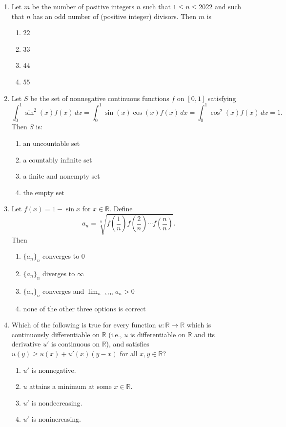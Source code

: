 \documentclass[11pt, a4paper]{article}
\begin{document}
\begin{enumerate}
  \item Let $m$ be the number of positive integers $n$ such that $1 \le n \le 2022$ and such that $n$ has an odd number of (positive integer) divisors. Then $m$ is
  \begin{enumerate}[label=(\alph*)]
    \item $22$
    \item $33$
    \item $44$
    \item $55$
  \end{enumerate}

  \item Let $S$ be the set of nonnegative continuous functions $f$ on $[0,1]$ satisfying
  \[
    \int_0^1 \sin^2(x) f(x)\,dx = \int_0^1 \sin(x)\cos(x) f(x)\,dx = \int_0^1 \cos^2(x) f(x)\,dx = 1.
  \]
  Then $S$ is:
  \begin{enumerate}[label=(\alph*)]
    \item an uncountable set
    \item a countably infinite set
    \item a finite and nonempty set
    \item the empty set
  \end{enumerate}

  \item Let $f(x) = 1 - \sin x$ for $x \in \mathbb{R}$. Define
  \[
    a_n = \sqrt[n]{f\left(\frac{1}{n}\right) f\left(\frac{2}{n}\right) \cdots f\left(\frac{n}{n}\right)}.
  \]
  Then
  \begin{enumerate}[label=(\alph*)]
    \item $\{a_n\}_n$ converges to $0$
    \item $\{a_n\}_n$ diverges to $\infty$
    \item $\{a_n\}_n$ converges and $\lim_{n \to \infty} a_n > 0$
    \item none of the other three options is correct
  \end{enumerate}

  \item Which of the following is true for every function $u: \mathbb{R} \to \mathbb{R}$ which is continuously differentiable on $\mathbb{R}$ (i.e., $u$ is differentiable on $\mathbb{R}$ and its derivative $u'$ is continuous on $\mathbb{R}$), and satisfies $u(y) \ge u(x) + u'(x)(y - x)$ for all $x, y \in \mathbb{R}$?
  \begin{enumerate}[label=(\alph*)]
    \item $u'$ is nonnegative.
    \item $u$ attains a minimum at some $x \in \mathbb{R}$.
    \item $u'$ is nondecreasing.
    \item $u'$ is nonincreasing.
  \end{enumerate}


\end{enumerate}
\end{document}
